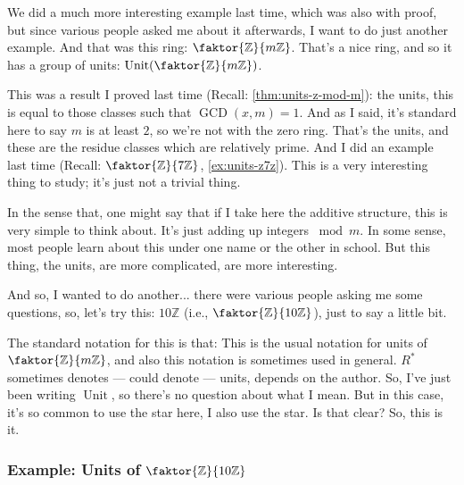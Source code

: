 \begin{speech}[00:05:14 - 00:07:18]
We did a much more interesting example last time, which was also with proof, but since various people asked me about it afterwards, I want to do just another example. And that was this ring: $\faktor{\mathbb{Z}}{m\mathbb{Z}}$.  That's a nice ring, and so it has a group of units: $\operatorname{Unit}(\faktor{\mathbb{Z}}{m\mathbb{Z}})$. 

This was a result I proved last time (Recall: \cref{thm:units-z-mod-m}): the units, this is equal to those classes such that $\operatorname{GCD}(x, m) = 1$.  And as I said, it's standard here to say $m$ is at least $2$, so we're not with the zero ring.  That's the units, and these are the residue classes which are relatively prime. And I did an example last time (Recall: $\faktor{\mathbb{Z}}{7\mathbb{Z}}$, \cref{ex:units-z7z}). This is a very interesting thing to study; it's just not a trivial thing.

In the sense that, one might say that if I take here the additive structure,  this is very simple to think about. It's just adding up integers $\bmod m$. In some sense, most people learn about this under one name or the other in school. But this thing, the units, are more complicated, are more interesting. 

And so, I wanted to do another... there were various people asking me some questions, so, let's try this: $10\mathbb{Z}$ (i.e., $\faktor{\mathbb{Z}}{10\mathbb{Z}}$), just to say a little bit.

The standard notation for this is that:  This is the usual notation for units of $\faktor{\mathbb{Z}}{m\mathbb{Z}}$, and also this notation is sometimes used in general. $R^*$ sometimes denotes --- could denote --- units, depends on the author. So, I've just been writing $\operatorname{Unit}$, so there's no question about what I mean. But in this case, it's so common to use the star here, I also use the star. Is that clear? So, this is it.
\end{speech}

\subsubsection{Example: Units of \texorpdfstring{$\faktor{\mathbb{Z}}{10\mathbb{Z}}$}{Z/10Z}}

